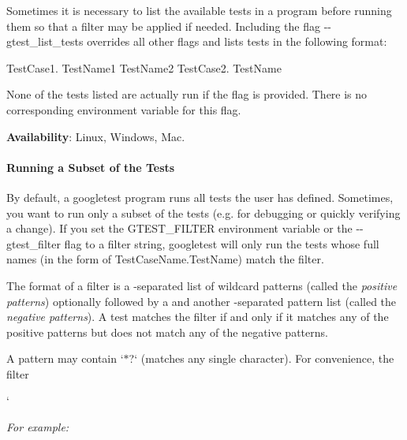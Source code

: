 Sometimes it is necessary to list the available tests in a program before running them so that a filter may be applied if needed. Including the flag {\ttfamily -\/-\/gtest\+\_\+list\+\_\+tests} overrides all other flags and lists tests in the following format\+:


\begin{DoxyCode}
TestCase1.
  TestName1
  TestName2
TestCase2.
  TestName
\end{DoxyCode}


None of the tests listed are actually run if the flag is provided. There is no corresponding environment variable for this flag.

{\bfseries Availability}\+: Linux, Windows, Mac.

\paragraph*{Running a Subset of the Tests}

By default, a googletest program runs all tests the user has defined. Sometimes, you want to run only a subset of the tests (e.\+g. for debugging or quickly verifying a change). If you set the {\ttfamily G\+T\+E\+S\+T\+\_\+\+F\+I\+L\+T\+ER} environment variable or the {\ttfamily -\/-\/gtest\+\_\+filter} flag to a filter string, googletest will only run the tests whose full names (in the form of {\ttfamily Test\+Case\+Name.\+Test\+Name}) match the filter.

The format of a filter is a \textquotesingle{}{\ttfamily \+:}\textquotesingle{}-\/separated list of wildcard patterns (called the {\itshape positive patterns}) optionally followed by a \textquotesingle{}{\ttfamily -\/}\textquotesingle{} and another \textquotesingle{}{\ttfamily \+:}\textquotesingle{}-\/separated pattern list (called the {\itshape negative patterns}). A test matches the filter if and only if it matches any of the positive patterns but does not match any of the negative patterns.

A pattern may contain `\textquotesingle{}$\ast$\textquotesingle{}?\textquotesingle{}` (matches any single character). For convenience, the filter

`

{\itshape For example\+:}


